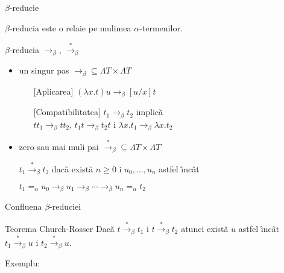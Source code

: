 \documentclass[xcolor=pdftex,romanian,colorlinks]{beamer}
\newcommand{\ra}{\rightarrow}
\newcommand{\sra}{\stackrel{*}{\rightarrow}}
\begin{document}
\begin{frame}[fragile]{$\beta$-reduc\ts ie}

$\beta$-reduc\ts ia este o rela\ts ie pe mul\ts imea $\alpha$-termenilor. 

\begin{block}{$\beta$-reduc\ts ia $\ra_\beta$, $\sra_\beta$}
\begin{itemize}
\item un singur pas
 $\ra_\beta\subseteq \Lambda T\times \Lambda T$
 
 \begin{itemize}
 \item[][Aplicarea] $(\lambda x.t)u\ra_\beta [u/x]t$ 
 \item[][Compatibilitatea] $t_1\ra_\beta t_2$ implic\u a \\ 
 \hspace*{3cm} $tt_1\ra_\beta tt_2$, $t_1t\ra_\beta t_2t$ \sh i 
 $\lambda x.t_1\ra_\beta\lambda x.t_2$
 \end{itemize}

\item zero sau mai mul\ts i pa\sh i  $\sra_\beta\subseteq \Lambda T\times \Lambda T$

$t_1\sra_\beta  t_2$ dac\u a  exist\u a $n\geq 0$ \sh i $u_0,\ldots, u_n$ astfel \^{\i}nc\^{a}t

$t_1=_\alpha u_0\ra_\beta u_1\ra_\beta\cdots\ra_\beta u_n =_\alpha t_2$
\end{itemize}
\end{block}
\end{frame}


\begin{frame}[fragile]{Confluen\ts a $\beta$-reduc\ts iei}

\begin{block}{Teorema Church-Rosser}
Dac\u a $t\sra_\beta t_1$ \sh i $t\sra_\beta t_2$ atunci exist\u a $u$ astfel \^{\i}nc\^ at $t_1\sra_\beta u$ \sh i $t_2\sra_\beta u$. 
\end{block}

Exemplu:

\end{frame}
\end{document}
